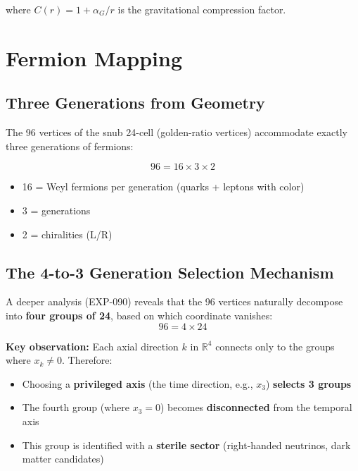 \documentclass[12pt,a4paper]{article}
\begin{document}
where $C(r) = 1 + \alpha_G/r$ is the gravitational compression factor.

\section{Fermion Mapping}

\subsection{Three Generations from Geometry}

The 96 vertices of the snub 24-cell (golden-ratio vertices) accommodate exactly three generations of fermions:

\begin{equation}
96 = 16 \times 3 \times 2
\end{equation}

\begin{itemize}
    \item 16 = Weyl fermions per generation (quarks + leptons with color)
    \item 3 = generations
    \item 2 = chiralities (L/R)
\end{itemize}

\subsection{The 4-to-3 Generation Selection Mechanism}

A deeper analysis (EXP-090) reveals that the 96 vertices naturally decompose into \textbf{four groups of 24}, based on which coordinate vanishes:
\begin{equation}
96 = 4 \times 24
\end{equation}

\textbf{Key observation:} Each axial direction $k$ in $\mathbb{R}^4$ connects only to the groups where $x_k \neq 0$. Therefore:

\begin{itemize}
    \item Choosing a \textbf{privileged axis} (the time direction, e.g., $x_3$) \textbf{selects 3 groups}
    \item The fourth group (where $x_3 = 0$) becomes \textbf{disconnected} from the temporal axis
    \item This group is identified with a \textbf{sterile sector} (right-handed neutrinos, dark matter candidates)
\end{itemize}
\end{document}
